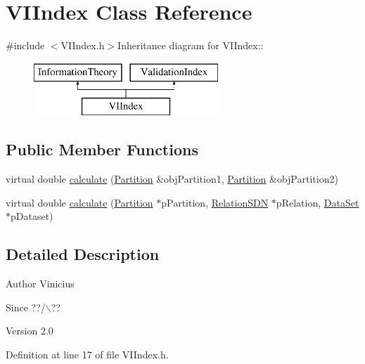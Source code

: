 \hypertarget{classVIIndex}{
\section{VIIndex Class Reference}
\label{classVIIndex}
}


{\ttfamily \#include $<$VIIndex.h$>$}Inheritance diagram for VIIndex::\begin{figure}[H]
\begin{center}
\leavevmode
\includegraphics[height=2cm]{classVIIndex}
\end{center}
\end{figure}
\subsection*{Public Member Functions}
\begin{DoxyCompactItemize}
\item 
virtual double \hyperlink{classVIIndex_ab097798a95465469bda061fbb57bf101}{calculate} (\hyperlink{classPartition}{Partition} \&objPartition1, \hyperlink{classPartition}{Partition} \&objPartition2)
\item 
virtual double \hyperlink{classVIIndex_a0d43fc7805b4c05b97cea7c850216f5f}{calculate} (\hyperlink{classPartition}{Partition} $\ast$pPartition, \hyperlink{classRelationSDN}{RelationSDN} $\ast$pRelation, \hyperlink{classDataSet}{DataSet} $\ast$pDataset)
\end{DoxyCompactItemize}


\subsection{Detailed Description}
\begin{DoxyAuthor}{Author}
Vinicius 
\end{DoxyAuthor}
\begin{DoxySince}{Since}
??/$\backslash$?? 
\end{DoxySince}
\begin{DoxyVersion}{Version}
2.0 
\end{DoxyVersion}


Definition at line 17 of file VIIndex.h.


